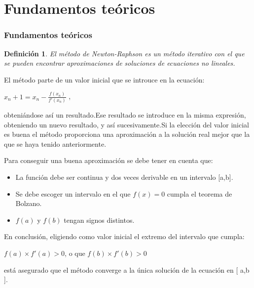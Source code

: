 \documentclass{beamer}
\newtheorem{definicion}{Definición}
\begin{document}
\section{Fundamentos teóricos}


\begin{frame}

\frametitle{Fundamentos teóricos}
\begin{definicion}
El método de Newton-Raphson es un método iterativo con el que se pueden encontrar aproximaciones de soluciones de ecuaciones no lineales. \pause
\end{definicion}
El método parte de un valor inicial que se introuce en la ecuación:
\begin{center}
$x_n+1 = x_n - \frac{f(x_n)}{f'(x_n)} $ , 
\end{center}
obteniándose así un resultado.Ese resultado se introduce en la misma expresión, obteniendo un nuevo resultado, y así sucesivamente.Si la elección del valor inicial es buena el método proporciona una aproximación a la solución real mejor que la que se haya tenido anteriormente.

\end{frame}

\begin{frame}
Para conseguir una buena aproximación se debe tener en cuenta que:
\begin{itemize}
\item
La función debe ser continua y dos veces derivable en un intervalo [a,b].\pause
\item
Se debe escoger un intervalo en el que $f(x)=0$ cumpla el teorema de Bolzano.\pause
\item
$f(a)$ y $f(b)$ tengan signos distintos.
\end{itemize}
\end{frame}

\begin{frame}
En conclusión, eligiendo como valor inicial el extremo del intervalo que cumpla: \pause
\begin{center}
$f(a) \times f'(a) > 0$,  o que
$f(b) \times f'(b) > 0$
\end{center}
está asegurado que el método converge a la única solución de la ecuación en [ a,b ].
\end{frame}
\end{document}
